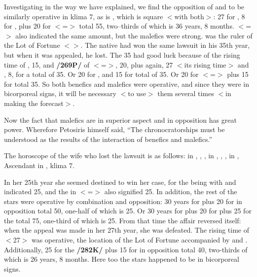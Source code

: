 Investigating in the way we have explained, we find the opposition of \Mars\xspace and \Venus\xspace to be similarly operative in klima
7, as is \Saturn, which is square $<$with both$>$: 27 for \Gemini, 8 for \Venus, plus 20 for \Virgo $<$=\Mercury$>$ total 55, two--thirds of which is 36 years, 8 months. \Pisces\xspace $<$=\Saturn$>$ also indicated the same amount, but the malefics were strong. \Venus\xspace was the ruler of the Lot of Fortune $<$\Libra$>$. The native had won the same lawsuit in his 35th year, but when it was appealed, he lost. The 35 had good luck because of the rising time of \Pisces, 15, and \textbf{/269P/} of \Gemini\xspace $<$=\Mercury$>$, 20, plus \Gemini\xspace again, 27 $<$its rising time$>$ and \Venus, 8, for a total of 35. Or 20 for \Gemini, and 15 for \Mars\xspace total of 35. Or 20 for \Virgo\xspace $<$=\Mercury$>$ plus 15 for \Mars\xspace total 35. So both benefics and malefics were operative, and since they were in bicorporeal signs, it will be necessary $<$to use$>$ them several times $<$in making the forecast$>$. 

Now the fact that malefics are in superior aspect and in opposition has great power. Wherefore Petosiris himself said, “The chronocratorships must be understood as the results of the interaction of benefics and malefics.” 

The horoscope of the wife who lost the lawsuit is as follows: \Sun\xspace in \Cancer, \Moon, \Saturn, \Jupiter\xspace in
\Sagittarius, \Mars, \Venus, \Mercury\xspace in \Gemini, Ascendant in \Capricorn, klima 7. 

In her 25th year she seemed destined to win her case, for the \Moon\xspace being with \Jupiter\xspace and \Saturn\xspace indicated 25, and the \Sun\xspace in \Cancer $<$=\Moon$>$ also signified 25. In addition, the rest of the stars were operative by combination and opposition: 30 years for \Saturn\xspace plus 20 for \Mercury\xspace in opposition total 50, one-half of which is 25. Or 30
years for \Saturn\xspace plus 20 for \Mercury\xspace plus 25 for the \Moon\xspace total 75, one-third of which is 25. From that time the affair reversed itself: when the appeal was made in her 27th year, she was defeated. The rising time of \Gemini\xspace $<$27$>$ was operative, the location of the Lot of Fortune accompanied by \Mars\xspace and \Mercury. Additionally, 25 for the \Moon\xspace \textbf{/282K/} plus 15 for \Mars\xspace in opposition total 40, two-thirds of which is 26 years, 8 months. Here too the stars happened to be in bicorporeal signs.

